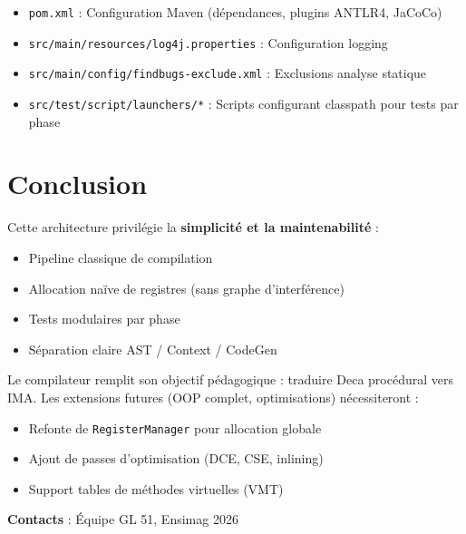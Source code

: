 \documentclass[12pt,a4paper]{article}
\begin{document}
\begin{itemize}[itemsep=0.2em]
    \item \texttt{pom.xml} : Configuration Maven (dépendances, plugins ANTLR4, JaCoCo)
    \item \texttt{src/main/resources/log4j.properties} : Configuration logging
    \item \texttt{src/main/config/findbugs-exclude.xml} : Exclusions analyse statique
    \item \texttt{src/test/script/launchers/*} : Scripts configurant classpath pour tests par phase
\end{itemize}

\section{Conclusion}

Cette architecture privilégie la \textbf{simplicité et la maintenabilité} :

\begin{itemize}[itemsep=0.2em]
    \item Pipeline classique de compilation
    \item Allocation naïve de registres (sans graphe d'interférence)
    \item Tests modulaires par phase
    \item Séparation claire AST / Context / CodeGen
\end{itemize}

Le compilateur remplit son objectif pédagogique : traduire Deca procédural vers IMA. Les extensions futures (OOP complet, optimisations) nécessiteront :

\begin{itemize}[itemsep=0.2em]
    \item Refonte de \texttt{RegisterManager} pour allocation globale
    \item Ajout de passes d'optimisation (DCE, CSE, inlining)
    \item Support tables de méthodes virtuelles (VMT)
\end{itemize}

\vspace{1cm}
\noindent\textbf{Contacts} : Équipe GL 51, Ensimag 2026
\end{document}
